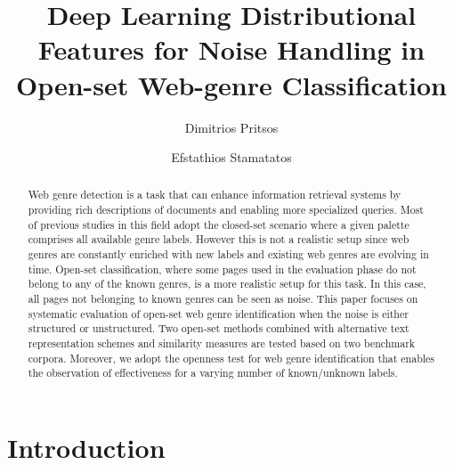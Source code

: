 \documentclass[runningheads]{llncs}
\begin{document}
\title{Deep Learning Distributional Features for Noise Handling in Open-set Web-genre Classification}

\author{Dimitrios Pritsos \and Efstathios Stamatatos }


\maketitle

\begin{abstract}
Web genre detection is a task that can enhance information retrieval systems by providing rich descriptions of documents and enabling more specialized queries. Most of previous studies in this field adopt the closed-set scenario where a given palette comprises all available genre labels. However this is not a realistic setup since web genres are constantly enriched with new labels and existing web genres are evolving in time. Open-set classification, where some pages used in the evaluation phase do not belong to any of the known genres, is a more realistic setup for this task. In this case, all pages not belonging to known genres can be seen as noise. This paper focuses on systematic evaluation of  open-set web genre identification when the noise is either structured or unstructured. Two open-set methods combined with alternative text representation schemes and similarity measures are tested based on two benchmark corpora. Moreover, we adopt the openness test for web genre identification that enables the observation of effectiveness for a varying number of known/unknown labels.

\end{abstract}


\section{Introduction}\label{sec:intro}
\end{document}
